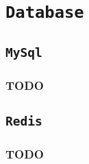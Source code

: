 \newpage
\chapter{\tt Database}
\thispagestyle{fancy}
\section{\tt MySql}

\subsection{TODO}

\section{\tt Redis}

\subsection{TODO}